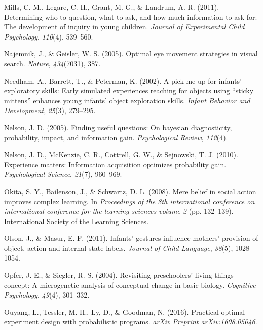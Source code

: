 \documentclass[english,floatsintext,man]{apa6}
\theoremstyle{definition}
\theoremstyle{definition}
\theoremstyle{definition}
\theoremstyle{remark}
\begin{document}
\hypertarget{ref-mills2011determining}{}
Mills, C. M., Legare, C. H., Grant, M. G., \& Landrum, A. R. (2011).
Determining who to question, what to ask, and how much information to
ask for: The development of inquiry in young children. \emph{Journal of
Experimental Child Psychology}, \emph{110}(4), 539--560.

\hypertarget{ref-najemnik2005optimal}{}
Najemnik, J., \& Geisler, W. S. (2005). Optimal eye movement strategies
in visual search. \emph{Nature}, \emph{434}(7031), 387.

\hypertarget{ref-needham2002pick}{}
Needham, A., Barrett, T., \& Peterman, K. (2002). A pick-me-up for
infants' exploratory skills: Early simulated experiences reaching for
objects using ``sticky mittens'' enhances young infants' object
exploration skills. \emph{Infant Behavior and Development},
\emph{25}(3), 279--295.

\hypertarget{ref-nelson2005finding}{}
Nelson, J. D. (2005). Finding useful questions: On bayesian
diagnosticity, probability, impact, and information gain.
\emph{Psychological Review}, \emph{112}(4).

\hypertarget{ref-nelson2010experience}{}
Nelson, J. D., McKenzie, C. R., Cottrell, G. W., \& Sejnowski, T. J.
(2010). Experience matters: Information acquisition optimizes
probability gain. \emph{Psychological Science}, \emph{21}(7), 960--969.

\hypertarget{ref-okita2008mere}{}
Okita, S. Y., Bailenson, J., \& Schwartz, D. L. (2008). Mere belief in
social action improves complex learning. In \emph{Proceedings of the 8th
international conference on international conference for the learning
sciences-volume 2} (pp. 132--139). International Society of the Learning
Sciences.

\hypertarget{ref-olson2011infants}{}
Olson, J., \& Masur, E. F. (2011). Infants' gestures influence mothers'
provision of object, action and internal state labels. \emph{Journal of
Child Language}, \emph{38}(5), 1028--1054.

\hypertarget{ref-opfer2004revisiting}{}
Opfer, J. E., \& Siegler, R. S. (2004). Revisiting preschoolers' living
things concept: A microgenetic analysis of conceptual change in basic
biology. \emph{Cognitive Psychology}, \emph{49}(4), 301--332.

\hypertarget{ref-ouyang2016practical}{}
Ouyang, L., Tessler, M. H., Ly, D., \& Goodman, N. (2016). Practical
optimal experiment design with probabilistic programs. \emph{arXiv
Preprint arXiv:1608.05046}.
\end{document}
